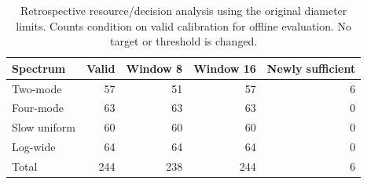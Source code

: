 \begin{table}[ht]\centering\small
\caption{Retrospective resource/decision analysis using the original diameter limits. Counts condition on valid calibration for offline evaluation. No target or threshold is changed.}
\label{tab:mcs-resource}
\begin{tabular}{lrrrr}\toprule
Spectrum & Valid & Window 8 & Window 16 & Newly sufficient\\\midrule
Two-mode & 57 & 51 & 57 & 6\\
Four-mode & 63 & 63 & 63 & 0\\
Slow uniform & 60 & 60 & 60 & 0\\
Log-wide & 64 & 64 & 64 & 0\\
\midrule Total & 244 & 238 & 244 & 6\\
\bottomrule\end{tabular}
\end{table}
